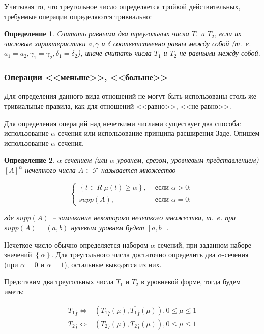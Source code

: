 \documentclass[a4paper,14pt,russian]{extreport}
\newtheorem{Def}{Определение} %
\begin{document}
Учитывая то, что треугольное число определяется тройкой действительных, требуемые операции определяются тривиально:

\begin{Def}
Считать равными два треугольных числа $T_1$ и $T_2$, если их числовые характеристики $a, \gamma$ и $\delta$ соответственно равны между собой (т.~е. $a_1=a_2, \gamma_1=\gamma_2, \delta_1=\delta_2$), иначе считать числа $T_1$ и $T_2$ не равными между собой.
\end{Def}

\subsubsection{Операции <<меньше>>, <<больше>>}

Для определения данного вида отношений не могут быть использованы столь же тривиальные правила, как для отношений <<равно>>, <<не равно>>.

Для определения операций над нечеткими числами существует два способа: использование $\alpha$-сечения или использование принципа расширения Заде. Опишем использование $\alpha$-сечения.

\begin{Def}
$\alpha$-сечением (или $\alpha$-уровнем, срезом, уровневым представлением) $\left[A\right]^\alpha$ нечеткого числа $A\in\mathcal{F}$ называется множество

\begin{equation}
\left\{
\begin{aligned}
\left\{t\in R\vert\mu\left(t\right)\geq\alpha\right\}, & \text{ если } \alpha > 0; \\
\overline{supp\left(A\right)}, & \text{ если } \alpha = 0;
\end{aligned}
\right.
\end{equation}

где $supp\left(A\right)$~-- замыкание некоторого нечеткого множества, т.~е. при $supp\left(A\right)=\left(a, b\right)$ нулевым уровнем будет $\left[a,b\right]$.
\end{Def}

Нечеткое число обычно определяется набором $\alpha$-сечений, при заданном наборе значений $\left\{\alpha\right\}$. Для треугольного числа достаточно определить два $\alpha$-сечения (при $\alpha=0$ и $\alpha=1$), остальные выводятся из них.

Представим два треугольных числа $T_1$ и $T_2$ в уровневой форме, тогда будем иметь:

\begin{equation}
\begin{aligned}
{T_1}_{\stackrel{'}I}\Leftrightarrow & \left({T_1}_{\stackrel{'}I}\left(\mu\right),\overline{{T_1}_{\stackrel{'}I}}\left(\mu\right)\right), 0\leq\mu\leq 1 \\
{T_2}_{\stackrel{'}I}\Leftrightarrow & \left({T_2}_{\stackrel{'}I}\left(\mu\right),\overline{{T_2}_{\stackrel{'}I}}\left(\mu\right)\right), 0\leq\mu\leq 1
\end{aligned}
\end{equation}
\end{document}
